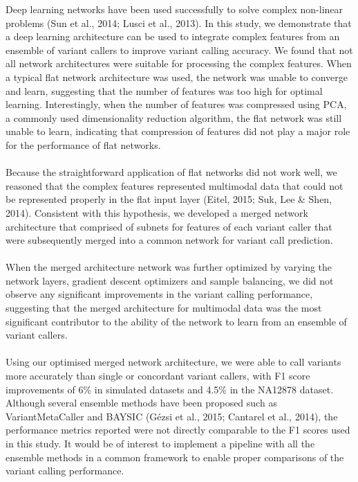 \documentclass{article}
\begin{document}
Deep learning networks have been used successfully to solve complex non-linear problems (Sun et al., 2014; Lusci et al., 2013). In this study, we demonstrate that a deep learning architecture can be used to integrate complex features from an ensemble of variant callers to improve variant calling accuracy. We found that not all network architectures were suitable for processing the complex features. When a typical flat network architecture was used, the network was unable to converge and learn, suggesting that the number of features was too high for optimal learning. Interestingly, when the number of features was compressed using PCA, a commonly used dimensionality reduction algorithm, the flat network was still unable to learn, indicating that compression of features did not play a major role for the performance of flat networks.\\\\
Because the straightforward application of flat networks did not work well, we reasoned that the complex features represented multimodal data that could not be represented properly in the flat input layer (Eitel, 2015; Suk, Lee \& Shen, 2014). Consistent with this hypothesis, we developed a merged network architecture that comprised of subnets for features of each variant caller that were subsequently merged into a common network for variant call prediction.\\\\
When the merged architecture network was further optimized by varying the network layers, gradient descent optimizers and sample balancing, we did not observe any significant improvements in the variant calling performance, suggesting that the merged architecture for multimodal data was the most significant contributor to the ability of the network to learn from an ensemble of variant callers.\\\\
Using our optimised merged network architecture, we were able to call variants more accurately than single or concordant variant callers, with F1 score improvements of 6\% in simulated datasets and 4.5\% in the NA12878 dataset. Although several ensemble methods have been proposed such as VariantMetaCaller and BAYSIC (Gézsi et al., 2015; Cantarel et al., 2014), the performance metrics reported were not directly comparable to the F1 scores used in this study. It would be of interest to implement a pipeline with all the ensemble methods in a common framework to enable proper comparisons of the variant calling performance.
\end{document}
